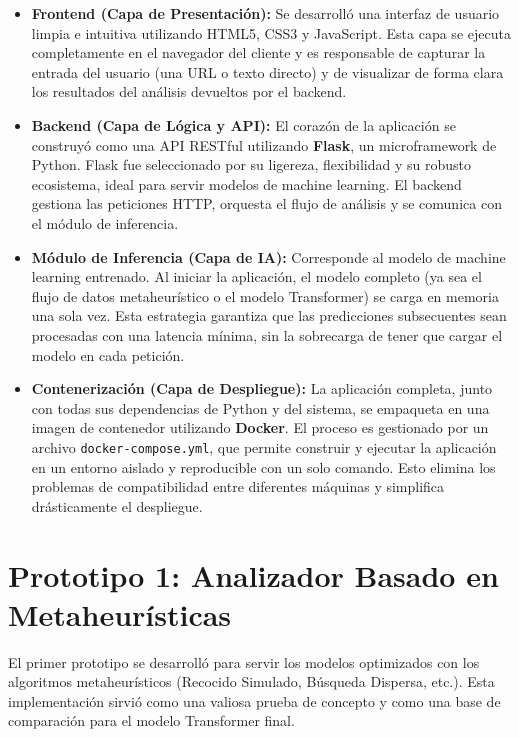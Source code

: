 \begin{itemize}
    \item \textbf{Frontend (Capa de Presentación):} Se desarrolló una interfaz de usuario limpia e intuitiva utilizando HTML5, CSS3 y JavaScript. Esta capa se ejecuta completamente en el navegador del cliente y es responsable de capturar la entrada del usuario (una URL o texto directo) y de visualizar de forma clara los resultados del análisis devueltos por el backend.
    
    \item \textbf{Backend (Capa de Lógica y API):} El corazón de la aplicación se construyó como una API RESTful utilizando \textbf{Flask}, un microframework de Python. Flask fue seleccionado por su ligereza, flexibilidad y su robusto ecosistema, ideal para servir modelos de machine learning. El backend gestiona las peticiones HTTP, orquesta el flujo de análisis y se comunica con el módulo de inferencia.
    
    \item \textbf{Módulo de Inferencia (Capa de IA):} Corresponde al modelo de machine learning entrenado. Al iniciar la aplicación, el modelo completo (ya sea el flujo de datos metaheurístico o el modelo Transformer) se carga en memoria una sola vez. Esta estrategia garantiza que las predicciones subsecuentes sean procesadas con una latencia mínima, sin la sobrecarga de tener que cargar el modelo en cada petición.
    
    \item \textbf{Contenerización (Capa de Despliegue):} La aplicación completa, junto con todas sus dependencias de Python y del sistema, se empaqueta en una imagen de contenedor utilizando \textbf{Docker}. El proceso es gestionado por un archivo \texttt{docker-compose.yml}, que permite construir y ejecutar la aplicación en un entorno aislado y reproducible con un solo comando. Esto elimina los problemas de compatibilidad entre diferentes máquinas y simplifica drásticamente el despliegue.
\end{itemize}

\section{Prototipo 1: Analizador Basado en Metaheurísticas}
El primer prototipo se desarrolló para servir los modelos optimizados con los algoritmos metaheurísticos (Recocido Simulado, Búsqueda Dispersa, etc.). Esta implementación sirvió como una valiosa prueba de concepto y como una base de comparación para el modelo Transformer final.

